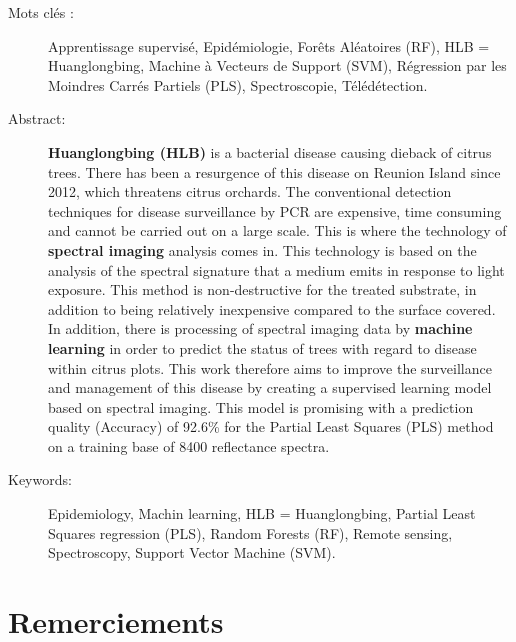 \documentclass[
  11pt,
  french,
  a4paper,
  extrafontsizes,onecolumn,openright
  ]{memoir}
\begin{document}
\begin{description}
\item[Mots clés :]
Apprentissage supervisé, Epidémiologie, Forêts Aléatoires (RF), HLB = Huanglongbing, Machine à Vecteurs de Support (SVM), Régression par les Moindres Carrés Partiels (PLS), Spectroscopie, Télédétection.
~\\
\vfill
\newpage
{}
\item[Abstract:]
\textbf{Huanglongbing (HLB)} is a bacterial disease causing dieback of citrus trees. There has been a resurgence of this disease on Reunion Island since 2012, which threatens citrus orchards. The conventional detection techniques for disease surveillance by PCR are expensive, time consuming and cannot be carried out on a large scale. This is where the technology of \textbf{spectral imaging} analysis comes in. This technology is based on the analysis of the spectral signature that a medium emits in response to light exposure. This method is non-destructive for the treated substrate, in addition to being relatively inexpensive compared to the surface covered. In addition, there is processing of spectral imaging data by \textbf{machine learning} in order to predict the status of trees with regard to disease within citrus plots. This work therefore aims to improve the surveillance and management of this disease by creating a supervised learning model based on spectral imaging. This model is promising with a prediction quality (Accuracy) of 92.6\% for the Partial Least Squares (PLS) method on a training base of 8400 reflectance spectra.

\item[Keywords:]
Epidemiology, Machin learning, HLB = Huanglongbing, Partial Least Squares regression (PLS), Random Forests (RF), Remote sensing, Spectroscopy, Support Vector Machine (SVM).

\end{description}








\LargeMargins
{
\hypersetup{linkcolor=}
\setcounter{tocdepth}{3}
\tableofcontents
}



\LargeMargins
\hypertarget{remerciements}{%
\chapter*{Remerciements}\label{remerciements}}
\end{document}

